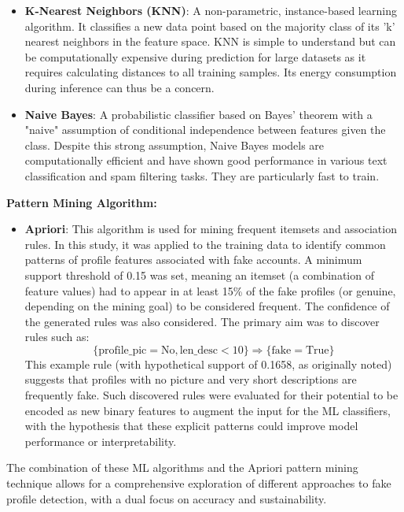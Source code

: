 \documentclass[conference]{IEEEtran}
\begin{document}
\begin{itemize}
    \item \textbf{K-Nearest Neighbors (KNN)}: A non-parametric, instance-based learning algorithm. It classifies a new data point based on the majority class of its 'k' nearest neighbors in the feature space. KNN is simple to understand but can be computationally expensive during prediction for large datasets as it requires calculating distances to all training samples. Its energy consumption during inference can thus be a concern.
    \item \textbf{Naive Bayes}: A probabilistic classifier based on Bayes' theorem with a "naive" assumption of conditional independence between features given the class. Despite this strong assumption, Naive Bayes models are computationally efficient and have shown good performance in various text classification and spam filtering tasks. They are particularly fast to train.
\end{itemize}

\textbf{Pattern Mining Algorithm:}
\begin{itemize}
    \item \textbf{Apriori}: This algorithm is used for mining frequent itemsets and association rules. In this study, it was applied to the training data to identify common patterns of profile features associated with fake accounts. A minimum support threshold of 0.15 was set, meaning an itemset (a combination of feature values) had to appear in at least 15\% of the fake profiles (or genuine, depending on the mining goal) to be considered frequent. The confidence of the generated rules was also considered. The primary aim was to discover rules such as:
    \begin{equation}
    \{\text{profile\_pic}=\text{No}, \text{len\_desc}<10\} \Rightarrow \{\text{fake}=\text{True}\}
    \label{eq:apriori}
    \end{equation}
    This example rule (with hypothetical support of 0.1658, as originally noted) suggests that profiles with no picture and very short descriptions are frequently fake. Such discovered rules were evaluated for their potential to be encoded as new binary features to augment the input for the ML classifiers, with the hypothesis that these explicit patterns could improve model performance or interpretability.
\end{itemize}
The combination of these ML algorithms and the Apriori pattern mining technique allows for a comprehensive exploration of different approaches to fake profile detection, with a dual focus on accuracy and sustainability.
\end{document}
